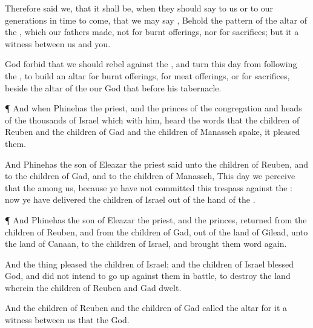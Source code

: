 {Therefore
said we, that it shall be, when they should
{}
say to us or to our
generations in time to
come, that we may
say
{},
Behold the
pattern of the
altar of the
{}, which our
fathers
made, not for burnt
offerings, nor for
sacrifices; but it
{} a
witness between us and you.

God
forbid that we should
rebel against the
{}, and
turn this
day from
following the
{}, to
build an
altar for burnt
offerings, for meat
offerings, or for
sacrifices, beside the
altar of the
{} our
God that
{}
before his
tabernacle.


\par }{\PP {}¶ And when
Phinehas the
priest, and the
princes of the
congregation and
heads of the
thousands of
Israel which
{} with him,
heard the
words that the
children of
Reuben and the
children of
Gad and the
children of
Manasseh
spake, it
pleased them.

And
Phinehas the
son of
Eleazar the
priest
said unto the
children of
Reuben, and to the
children of
Gad, and to the
children of
Manasseh, This
day we
perceive that the
{}
{}
among us, because ye have not
committed this
trespass against the
{}:
now ye have
delivered the
children of
Israel out of the
hand of the
{}.


\par }{\PP {}¶ And
Phinehas the
son of
Eleazar the
priest, and the
princes,
returned from the
children of
Reuben, and from the
children of
Gad, out of the
land of
Gilead, unto the
land of
Canaan, to the
children of
Israel, and
brought them
word
again.

And the
thing
pleased the
children of
Israel; and the
children of
Israel
blessed
God, and did not
intend to go
up against them in
battle, to
destroy the
land wherein the
children of
Reuben and
Gad
dwelt.

And the
children of
Reuben and the
children of
Gad
called the
altar
{} for it
{} a
witness between us that the
{}
{}
God.




\par }
